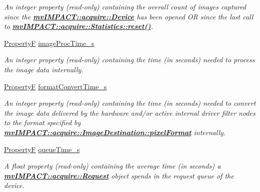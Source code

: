 \begin{DoxyCompactItemize}
\begin{DoxyCompactList}\small\item\em An integer property {\bfseries }(read-\/only) containing the overall count of images captured since the {\bfseries \hyperlink{classmv_i_m_p_a_c_t_1_1acquire_1_1_device}{mv\+I\+M\+P\+A\+C\+T\+::acquire\+::\+Device}} has been opened O\+R since the last call to {\bfseries \hyperlink{classmv_i_m_p_a_c_t_1_1acquire_1_1_statistics_adc21a9add6973f8f829f751e616b0a43}{mv\+I\+M\+P\+A\+C\+T\+::acquire\+::\+Statistics\+::reset()}}. \end{DoxyCompactList}\item 
\hyperlink{group___common_interface_gaf54865fe5a3d5cfd15f9a111b40d09f9}{Property\+F} \hyperlink{classmv_i_m_p_a_c_t_1_1acquire_1_1_statistics_ac65c579e00cb51b5c841b6730631fe7e}{image\+Proc\+Time\+\_\+s}
\begin{DoxyCompactList}\small\item\em An integer property {\bfseries }(read-\/only) containing the time (in seconds) needed to process the image data internally. \end{DoxyCompactList}\item 
\hyperlink{group___common_interface_gaf54865fe5a3d5cfd15f9a111b40d09f9}{Property\+F} \hyperlink{classmv_i_m_p_a_c_t_1_1acquire_1_1_statistics_a27471ea82829cdb1540804d89dad5f57}{format\+Convert\+Time\+\_\+s}
\begin{DoxyCompactList}\small\item\em An integer property {\bfseries }(read-\/only) containing the time (in seconds) needed to convert the image data delivered by the hardware and/or active internal driver filter nodes to the format specified by {\bfseries \hyperlink{classmv_i_m_p_a_c_t_1_1acquire_1_1_image_destination_abfd0d30346d66251d5941a5e57efb784}{mv\+I\+M\+P\+A\+C\+T\+::acquire\+::\+Image\+Destination\+::pixel\+Format}} internally. \end{DoxyCompactList}\item 
\hyperlink{group___common_interface_gaf54865fe5a3d5cfd15f9a111b40d09f9}{Property\+F} \hyperlink{classmv_i_m_p_a_c_t_1_1acquire_1_1_statistics_aad94af2739fc56bcd30f5fd062dd6374}{queue\+Time\+\_\+s}
\begin{DoxyCompactList}\small\item\em A float property {\bfseries }(read-\/only) containing the average time (in seconds) a {\bfseries \hyperlink{classmv_i_m_p_a_c_t_1_1acquire_1_1_request}{mv\+I\+M\+P\+A\+C\+T\+::acquire\+::\+Request}} object spends in the request queue of the device. \end{DoxyCompactList}\item 

\end{DoxyCompactItemize}
